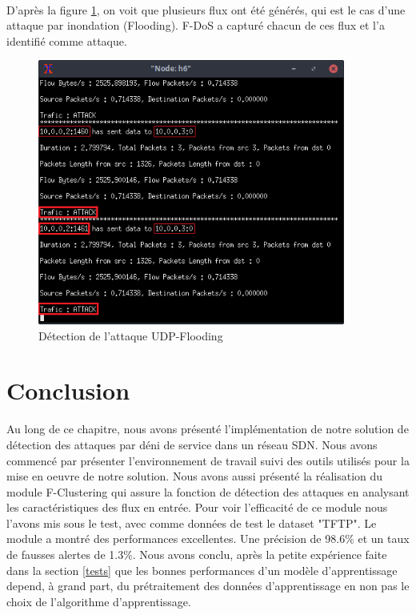 \paragraph{}
D'après la figure \ref{fig:FloodingAttack}, on voit que plusieurs flux ont été générés, qui est le cas d'une attaque par inondation (Flooding). F-DoS a capturé chacun de ces flux et l'a identifié comme attaque.

\begin{figure}[h]
\centering
\includegraphics[width=0.9\textwidth]{Figures/simulation/mininet/IDS/attack_udp_flood}
\decoRule
\caption{Détection de l'attaque UDP-Flooding}
\label{fig:FloodingAttack}
\end{figure}

\section{Conclusion}
Au long de ce chapitre, nous avons présenté l'implémentation de notre solution de détection des attaques par déni de service dans un réseau SDN. Nous avons commencé par présenter l'environnement de travail suivi des outils utilisés pour la mise en oeuvre de notre solution. Nous avons aussi présenté la réalisation du module F-Clustering qui assure la fonction de détection des attaques en analysant les caractéristiques des flux en entrée. Pour voir l'efficacité de ce module nous l'avons mis sous le test, avec comme données de test le dataset "TFTP". Le module a montré des performances excellentes. Une précision de 98.6\% et un taux de fausses alertes de 1.3\%. Nous avons conclu, après la petite expérience faite dans la section \ref{tests} que les bonnes performances d'un modèle d'apprentissage depend, à grand part, du prétraitement des données d'apprentissage en non pas le choix de l'algorithme d'apprentissage.\\


